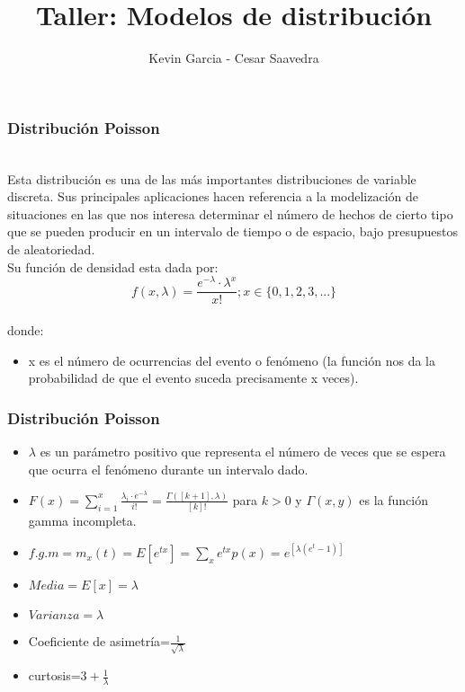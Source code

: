 \documentclass[12pt]{beamer}
\author{Kevin Garcia - Cesar Saavedra}
\title{Taller: Modelos de distribución}
\begin{document}
\begin{frame}
\titlepage
\end{frame}

\begin{frame}
\frametitle{Distribución Poisson}
~\\  Esta distribución es una de las más importantes distribuciones de variable discreta. Sus principales aplicaciones hacen referencia a la modelización de situaciones en las que nos interesa determinar el número de hechos de cierto tipo que se pueden producir en un intervalo de tiempo o de espacio, bajo presupuestos de aleatoriedad.
~\\ Su función de densidad esta dada por: 
~\\$$f(x,\lambda)=\frac{e^{-\lambda}\cdot \lambda^x}{x!}  ; x \in \{0,1,2,3,...\}$$
~\\donde:
\begin{itemize} 
\item x es el número de ocurrencias del evento o fenómeno (la función nos da la probabilidad de que el evento suceda precisamente x veces).
\end{itemize}
\end{frame}

\begin{frame}
\frametitle{Distribución Poisson}
\begin{itemize}
\item $\lambda$ es un parámetro positivo que representa el número de veces que se espera que ocurra el fenómeno durante un intervalo dado.
\item $F(x)=\sum\limits_{i=1}^{x} \frac{\lambda_{i}\cdot e^{-\lambda}}{i!}=\frac{\Gamma([k+1],\lambda)}{[k]!}$ para $k>0$ y $\Gamma(x,y)$ es la función gamma incompleta.
\item $f.g.m=m_{x}(t)=E[e^{tx}]=\sum\limits_{x} e^{tx}p(x)= e^{[\lambda(e^t-1)]}$
\item $Media=E[x]=\lambda$
\item $Varianza=\lambda$
\item Coeficiente de asimetría=$\frac{1}{\sqrt{\lambda}}$
\item curtosis=$3+\frac{1}{\lambda}$
\end{itemize}
\end{frame}
\end{document}
